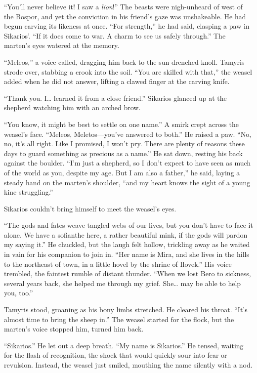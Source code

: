 ``You'll never believe it! I saw a \emph{lion}!'' The beasts were nigh-unheard of west of the Bospor, and yet the conviction in his friend's gaze was unshakeable. He had begun carving its likeness at once. ``For strength,'' he had said, clasping a paw in Sikarios'. ``If it does come to war. A charm to see us safely through.'' The marten's eyes watered at the memory.

``Meleos,'' a voice called, dragging him back to the sun-drenched knoll. Tamyris strode over, stabbing a crook into the soil. ``You are skilled with that,'' the weasel added when he did not answer, lifting a clawed finger at the carving knife.

``Thank you. I\ldots{} learned it from a close friend.'' Sikarios glanced up at the shepherd watching him with an arched brow.

``You know, it might be best to settle on one name.'' A smirk crept across the weasel's face. ``Meleos, Meletos---you've answered to both.'' He raised a paw. ``No, no, it's all right. Like I promised, I won't pry. There are plenty of reasons these days to guard something as precious as a name.'' He sat down, resting his back against the boulder. ``I'm just a shepherd, so I don't expect to have seen as much of the world as you, despite my age. But I am also a father,'' he said, laying a steady hand on the marten's shoulder, ``and my heart knows the sight of a young kine struggling.''

Sikarios couldn't bring himself to meet the weasel's eyes.

``The gods and fates weave tangled webs of our lives, but you don't have to face it alone. We have a sofianthe here, a rather beautiful mink, if the gods will pardon my saying it.'' He chuckled, but the laugh felt hollow, trickling away as he waited in vain for his companion to join in. ``Her name is Mira, and she lives in the hills to the northeast of town, in a little hovel by the shrine of Ilovek.'' His voice trembled, the faintest rumble of distant thunder. ``When we lost Bero to sickness, several years back, she helped me through my grief. She\ldots{} may be able to help you, too.''

Tamyris stood, groaning as his bony limbs stretched. He cleared his throat. ``It's almost time to bring the sheep in.'' The weasel started for the flock, but the marten's voice stopped him, turned him back.

``Sikarios.'' He let out a deep breath. ``My name is Sikarios.'' He tensed, waiting for the flash of recognition, the shock that would quickly sour into fear or revulsion. Instead, the weasel just smiled, mouthing the name silently with a nod.

